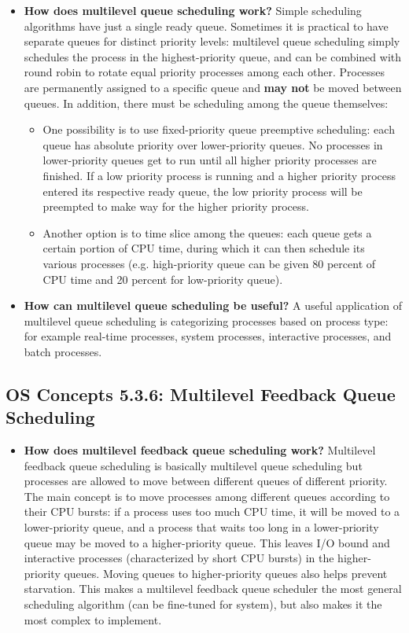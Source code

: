 \documentclass[12pt]{article}
\begin{document}
\begin{itemize}
    \item \textbf{How does multilevel queue scheduling work?} Simple scheduling algorithms have just a single ready queue. Sometimes it is practical to have separate queues for distinct priority levels: multilevel queue scheduling simply schedules the process in the highest-priority queue, and can be combined with round robin to rotate equal priority processes among each other. Processes are permanently assigned to a specific queue and \textbf{may not} be moved between queues. In addition, there must be scheduling among the queue themselves:
        \begin{itemize}
            \item One possibility is to use fixed-priority queue preemptive scheduling: each queue has absolute priority over lower-priority queues. No processes in lower-priority queues get to run until all higher priority processes are finished. If a low priority process is running and a higher priority process entered its respective ready queue, the low priority process will be preempted to make way for the higher priority process.
            \item Another option is to time slice among the queues: each queue gets a certain portion of CPU time, during which it can then schedule its various processes (e.g. high-priority queue can be given 80 percent of CPU time and 20 percent for low-priority queue).
        \end{itemize}
    \item \textbf{How can multilevel queue scheduling be useful?} A useful application of multilevel queue scheduling is categorizing processes based on process type: for example real-time processes, system processes, interactive processes, and batch processes.
\end{itemize}

\subsection*{OS Concepts 5.3.6: Multilevel Feedback Queue Scheduling}

\begin{itemize}
    \item \textbf{How does multilevel feedback queue scheduling work?} Multilevel feedback queue scheduling is basically multilevel queue scheduling but processes are allowed to move between different queues of different priority. The main concept is to move processes among different queues according to their CPU bursts: if a process uses too much CPU time, it will be moved to a lower-priority queue, and a process that waits too long in a lower-priority queue may be moved to a higher-priority queue. This leaves I/O bound and interactive processes (characterized by short CPU bursts) in the higher-priority queues. Moving queues to higher-priority queues also helps prevent starvation. This makes a multilevel feedback queue scheduler the most general scheduling algorithm (can be fine-tuned for system), but also makes it the most complex to implement.
\end{itemize}
\end{document}
